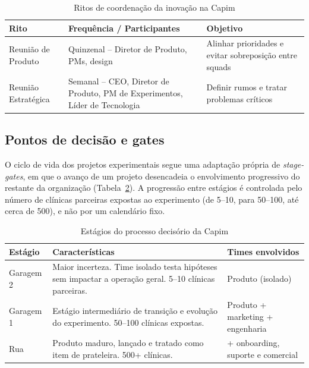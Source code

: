 \begin{table}[h]
  \centering
  \caption{Ritos de coordenação da inovação na Capim}
  \label{tab:ritos}
  \begin{tabularx}{\textwidth}{lXX}
    \toprule
    \textbf{Rito} & \textbf{Frequência / Participantes} & \textbf{Objetivo} \\
    \midrule
    Reunião de Produto & Quinzenal -- Diretor de Produto, PMs, design & Alinhar prioridades e evitar sobreposição entre squads \\
    Reunião Estratégica & Semanal -- CEO, Diretor de Produto, PM de Experimentos, Líder de Tecnologia & Definir rumos e tratar problemas críticos \\
    \bottomrule
  \end{tabularx}
\end{table}

\subsection{Pontos de decisão e gates}

O ciclo de vida dos projetos experimentais segue uma adaptação própria de \textit{stage-gates}, em que o avanço de um projeto desencadeia o envolvimento progressivo do restante da organização (Tabela~\ref{tab:gates}). A progressão entre estágios é controlada pelo número de clínicas parceiras expostas ao experimento (de 5--10, para 50--100, até cerca de 500), e não por um calendário fixo.

\begin{table}[h]
  \centering
  \caption{Estágios do processo decisório da Capim}
  \label{tab:gates}
  \begin{tabularx}{\textwidth}{lXX}
    \toprule
    \textbf{Estágio} & \textbf{Características} & \textbf{Times envolvidos} \\
    \midrule
    Garagem 2 & Maior incerteza. Time isolado testa hipóteses sem impactar a operação geral. 5--10 clínicas parceiras. & Produto (isolado) \\
    Garagem 1 & Estágio intermediário de transição e evolução do experimento. 50--100 clínicas expostas. & Produto + marketing + engenharia \\
    Rua & Produto maduro, lançado e tratado como item de prateleira. 500+ clínicas. & + onboarding, suporte e comercial \\
    \bottomrule
  \end{tabularx}
\end{table}


